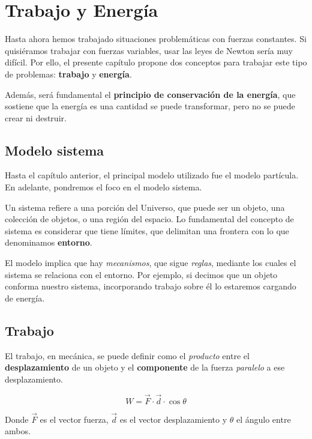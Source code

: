 \section{Trabajo y Energía}

Hasta ahora hemos trabajado situaciones problemáticas con fuerzas constantes.
Si quisiéramos trabajar con fuerzas variables,
usar las leyes de Newton sería muy difícil.
Por ello,
el presente capítulo propone dos conceptos para trabajar este tipo de problemas:
\textbf{trabajo} y \textbf{energía}.

Además, será fundamental el \textbf{principio de conservación de la energía},
que sostiene que la energía es una cantidad se puede transformar,
pero no se puede crear ni destruir.

\subsection{Modelo sistema}

Hasta el capítulo anterior,
el principal modelo utilizado fue el modelo partícula.
En adelante, pondremos el foco en el modelo sistema.

Un sistema refiere a una porción del Universo,
que puede ser un objeto, una colección de objetos,
o una región del espacio.
Lo fundamental del concepto de sistema es considerar que tiene límites,
que delimitan una frontera con lo que denominamos \textbf{entorno}.

El modelo implica que hay \textit{mecanismos},
que sigue \textit{reglas},
mediante los cuales el sistema se relaciona con el entorno.
Por ejemplo,
si decimos que un objeto conforma nuestro sistema,
incorporando trabajo sobre él lo estaremos cargando de energía.

\subsection{Trabajo}

El trabajo, en mecánica,
se puede definir como el \textit{producto} entre
el \textbf{desplazamiento} de un objeto y el
\textbf{componente} de la fuerza \textit{paralelo} a ese desplazamiento.

\begin{equation*}
    W = \vec{F} \cdot \vec{d} \cdot \cos\theta
\end{equation*}

Donde \(\vec{F}\) es el vector fuerza,
\(\vec{d}\) es el vector desplazamiento
y \(\theta\) el ángulo entre ambos.

